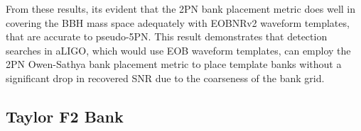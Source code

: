 \documentclass[aps,
prd,
amsmath,
amssymb,
twocolumn,
floatfix,
groupedaddress]{revtex4-1}
\newcommand{\FF}{\mathcal{FF}}
\newcommand{\MM}{\mathrm{MM}}
\begin{document}
From these results, its evident that the 2PN bank placement metric does well in covering the BBH mass space adequately with EOBNRv2 waveform templates, that are accurate to pseudo-5PN. This result demonstrates that detection searches in aLIGO, which would use EOB waveform templates, can employ the 2PN Owen-Sathya bank placement metric to place template banks without a significant drop in recovered SNR due to the coarseness of the bank grid.

\subsection{Taylor F2 Bank}\label{sec:level2:EffectualnessTaylorF2}

\end{document}

